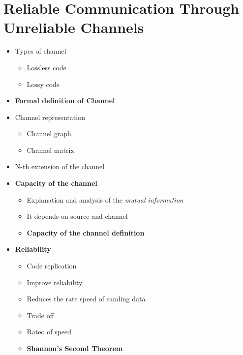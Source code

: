 \chapter{Reliable Communication Through Unreliable Channels}
\begin{itemize}
    \item Types of channel
    \begin{itemize}
        \item Lossless code
        \item Lossy code
    \end{itemize}
    \item \textbf{Formal definition of Channel}
    \item Channel representation
    \begin{itemize}
        \item Channel graph
        \item Channel matrix
    \end{itemize}
    \item N-th extension of the channel
    \item \textbf{Capacity of the channel}
    \begin{itemize}
        \item Explanation and analysis of the \textit{mutual information}
        \item It depends on source and channel
        \item \textbf{Capacity of the channel definition}
    \end{itemize}
    \item \textbf{Reliability}
    \begin{itemize}
        \item Code replication
        \item Improve reliability
        \item Reduces the rate speed of sanding data
        \item Trade off
        \item Rateo of speed
        \item \textbf{Shannon's Second Theorem}
    \end{itemize}
\end{itemize}

